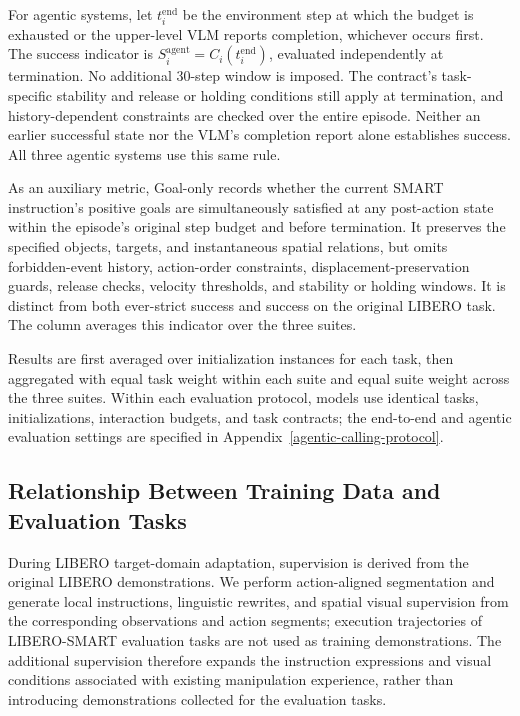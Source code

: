 For agentic systems, let \(t_i^{\mathrm{end}}\) be the environment step at
which the budget is exhausted or the upper-level VLM reports completion,
whichever occurs first. The success indicator is
\(S_i^{\mathrm{agent}}=C_i(t_i^{\mathrm{end}})\), evaluated independently
at termination. No additional 30-step window is imposed. The contract's
task-specific stability and release or holding conditions still apply at
termination, and history-dependent constraints are checked over the entire
episode. Neither an earlier successful state nor the VLM's completion
report alone establishes success. All three agentic systems use this same rule.

As an auxiliary metric, Goal-only records whether the current SMART instruction's positive goals are
simultaneously satisfied at any post-action state within the episode's original step budget and
before termination. It preserves the specified objects, targets, and instantaneous spatial
relations, but omits forbidden-event history, action-order constraints, displacement-preservation
guards, release checks, velocity thresholds, and stability or holding windows. It is distinct from
both ever-strict success and success on the original LIBERO task. The column averages this indicator
over the three suites.

Results are first averaged over initialization instances for each task,
then aggregated with equal task weight within each suite and equal suite
weight across the three suites. Within each evaluation protocol, models
use identical tasks, initializations, interaction budgets, and task
contracts; the end-to-end and agentic evaluation settings are specified
in Appendix~\ref{agentic-calling-protocol}.

\subsection{Relationship Between Training Data and Evaluation Tasks}
\label{app:smart-training-boundary}

During LIBERO target-domain adaptation, supervision is derived
from the original LIBERO demonstrations. We perform action-aligned
segmentation and generate local instructions, linguistic rewrites, and
spatial visual supervision from the corresponding observations and
action segments; execution trajectories of LIBERO-SMART evaluation
tasks are not used as training demonstrations. The additional
supervision therefore expands the instruction expressions and visual
conditions associated with existing manipulation experience, rather
than introducing demonstrations collected for the evaluation tasks.

